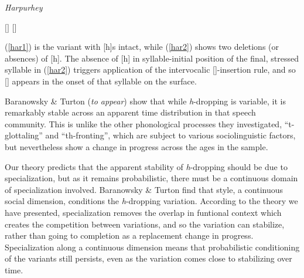 	\begin{exe}
		\ex \quad \textsl{Harpurhey}
		\begin{xlist}
			\ex \label{har1} $[$$]$
			\ex \label{har2} $[$$]$
		\end{xlist}
	\end{exe}

\noindent (\ref{har1}) is the variant with [h]s intact, while (\ref{har2}) shows two deletions (or absences) of [h].
The absence of [h] in syllable-initial position of the final, stressed syllable in (\ref{har2}) triggers application of the intervocalic []-insertion rule, and so [] appears in the onset of that syllable on the surface.
	
Baranowsky \& Turton (\textsl{to appear}) show that while \textsl{h}-dropping is variable, it is remarkably stable across an apparent time distribution in that speech community.
This is unlike the other phonological processes they investigated, ``t-glottaling'' and ``th-fronting'', which are subject to various sociolinguistic factors, but nevertheless show a change in progress across the ages in the sample.

Our theory predicts that the apparent stability of \textsl{h}-dropping should be due to specialization, but as it remains probabilistic, there must be a continuous domain of specialization involved. Baranowsky \& Turton find that style, a continuous social dimension, conditions the \textsl{h}-dropping variation.
According to the theory we have presented, specialization removes the overlap in funtional context which creates the competition between variations, and so the variation can stabilize, rather than going to completion as a replacement change in progress.
Specialization along a continuous dimension means that probabilistic conditioning of the variants still persists, even as the variation comes close to stabilizing over time.

